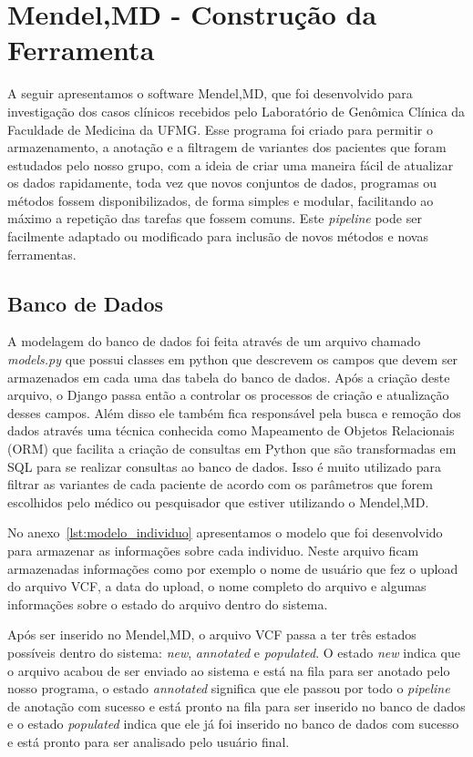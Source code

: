 \section{Mendel,MD - Construção da Ferramenta}

A seguir apresentamos o software Mendel,MD, que foi desenvolvido para investigação dos casos clínicos recebidos pelo Laboratório de Genômica Clínica da Faculdade de Medicina da UFMG. Esse programa foi criado para permitir o armazenamento, a anotação e a filtragem de variantes dos pacientes que foram estudados pelo nosso grupo, com a ideia de criar uma maneira fácil de atualizar os dados rapidamente, toda vez que novos conjuntos de dados, programas ou métodos fossem disponibilizados, de forma simples e modular, facilitando ao máximo a repetição das tarefas que fossem comuns. Este \textit{pipeline} pode ser facilmente adaptado ou modificado para inclusão de novos métodos e novas ferramentas.

\subsection{Banco de Dados}
A modelagem do banco de dados foi feita através de um arquivo chamado \textit{models.py} que possui classes em python que descrevem os campos que devem ser armazenados em cada uma das tabela do banco de dados. Após a criação deste arquivo, o Django passa então a controlar os processos de criação e atualização desses campos. Além disso ele também fica responsável pela busca e remoção dos dados através uma técnica conhecida como Mapeamento de Objetos Relacionais (ORM) que facilita a criação de consultas em Python que são transformadas em SQL para se realizar consultas ao banco de dados. Isso é muito utilizado para filtrar as variantes de cada paciente de acordo com os parâmetros que forem escolhidos pelo médico ou pesquisador que estiver utilizando o Mendel,MD.

No anexo~\ref{lst:modelo_individuo} apresentamos o modelo que foi desenvolvido para armazenar as informações sobre cada individuo. Neste arquivo ficam armazenadas informações como por exemplo o nome de usuário que fez o upload do arquivo VCF, a data do upload, o nome completo do arquivo e algumas informações sobre o estado do arquivo dentro do sistema.

Após ser inserido no Mendel,MD, o arquivo VCF passa a ter três estados possíveis dentro do sistema: \textit{new}, \textit{annotated} e \textit{populated}. O estado \textit{new} indica que o arquivo acabou de ser enviado ao sistema e está na fila para ser anotado pelo nosso programa, o estado \textit{annotated} significa que ele passou por todo o \textit{pipeline} de anotação com sucesso e está pronto na fila para ser inserido no banco de dados e o estado \textit{populated} indica que ele já foi inserido no banco de dados com sucesso e está pronto para ser analisado pelo usuário final.

